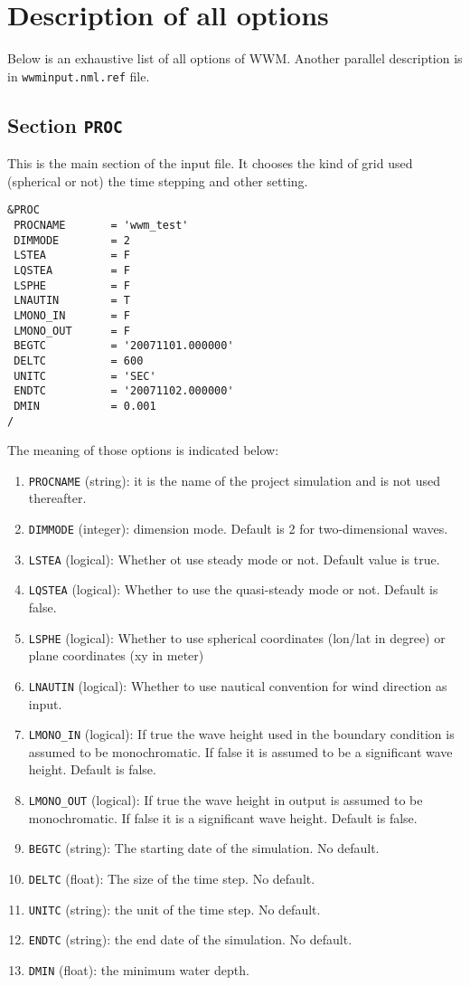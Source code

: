 \documentclass[12pt]{amsart}
\begin{document}
\section{Description of all options}
Below is an exhaustive list of all options of WWM.
Another parallel description is in {\tt wwminput.nml.ref} file.

\subsection{Section {\tt PROC}}
This is the main section of the input file. It chooses the kind of grid used (spherical or not) the time stepping and other setting.
\begin{verbatim}
&PROC
 PROCNAME       = 'wwm_test'
 DIMMODE        = 2                  
 LSTEA          = F                  
 LQSTEA         = F                  
 LSPHE          = F                  
 LNAUTIN        = T
 LMONO_IN       = F                
 LMONO_OUT      = F                
 BEGTC          = '20071101.000000'
 DELTC          = 600              
 UNITC          = 'SEC'            
 ENDTC          = '20071102.000000'
 DMIN           = 0.001            
/
\end{verbatim}
The meaning of those options is indicated below:
\begin{enumerate}
\item {\tt PROCNAME} (string): it is the name of the project simulation and is not used thereafter.
\item {\tt DIMMODE} (integer): dimension mode. Default is 2 for two-dimensional waves.
\item {\tt LSTEA} (logical): Whether ot use steady mode or not. Default value is true.
\item {\tt LQSTEA} (logical): Whether to use the quasi-steady mode or not. Default is false.
\item {\tt LSPHE} (logical): Whether to use spherical coordinates (lon/lat in degree) or plane coordinates (xy in meter)
\item {\tt LNAUTIN} (logical): Whether to use nautical convention for wind direction as input.
\item {\tt LMONO\_IN} (logical): If true the wave height used in the boundary condition is assumed to be monochromatic. If false it is assumed to be a significant wave height. Default is false.
\item {\tt LMONO\_OUT} (logical): If true the wave height in output is assumed to be monochromatic. If false it is a significant wave height. Default is false.
\item {\tt BEGTC} (string): The starting date of the simulation. No default.
\item {\tt DELTC} (float): The size of the time step. No default.
\item {\tt UNITC} (string): the unit of the time step. No default.
\item {\tt ENDTC} (string): the end date of the simulation. No default.
\item {\tt DMIN} (float): the minimum water depth.
\end{enumerate}
\end{document}
